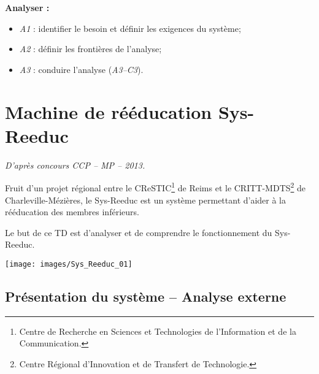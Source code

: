 \documentclass[10pt]{article}
\begin{document}



 \renewcommand{\baselinestretch}{1.2}
\setlength{\parskip}{2ex plus 0.5ex minus 0.2ex}


\begin{comp}
\noindent \textbf{Analyser :} 
\begin{itemize}
\item \textit{A1} : identifier le besoin et définir les exigences du système;
\item \textit{A2} : définir les frontières de l'analyse;
\item \textit{A3} : conduire l'analyse (\textit{A3--C3}).
\end{itemize}

\end{comp}

\section*{Machine de rééducation Sys-Reeduc}

\begin{flushright}
\textit{D'après concours CCP -- MP -- 2013.}
\end{flushright}



\begin{minipage}[c]{.7\linewidth}
Fruit d'un projet régional entre le CReSTIC\footnote{Centre de Recherche en Sciences et Technologies de l'Information et de la Communication.} de Reims et le CRITT-MDTS\footnote{Centre Régional d'Innovation et de Transfert de Technologie.} de Charleville-Mézières, le Sys-Reeduc est un système permettant d'aider à la rééducation des membres inférieurs. 
\begin{obj} 
Le but de ce TD est d'analyser et de comprendre le fonctionnement du Sys-Reeduc.
\end{obj}

\end{minipage} \hfill
\begin{minipage}[c]{.27\linewidth}
\begin{center}
\texttt{[image: images/Sys\_Reeduc\_01]}
\end{center}
\end{minipage}

\subsection*{Présentation du système -- Analyse externe}
\end{document}
